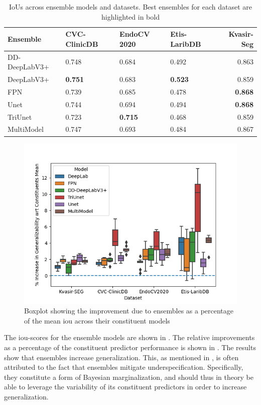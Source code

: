 \begin{table}[h]
    \centering
    \begin{tabularx}{\linewidth}{lXXXr}
\toprule
Ensemble  & CVC-ClinicDB & EndoCV 2020 & Etis-LaribDB & Kvasir-Seg \\
\midrule
DD-DeepLabV3+ & 0.748 &0.684 &0.492 &0.863 \\
DeepLabV3+ & \textbf{0.751} &0.683 &\textbf{0.523} &0.859 \\
FPN & 0.739 &0.685 &0.478 &\textbf{0.868} \\
Unet & 0.744 &0.694 &0.494 &\textbf{0.868} \\
TriUnet & 0.723 & \textbf{0.715} &  0.468 & 0.859 \\
MultiModel & 0.747 &0.693 &0.484 &0.867 \\
\bottomrule
\end{tabularx}
    \caption{IoUs across ensemble models and datasets. Best ensembles for each dataset are highlighted in bold}
    \label{tab:ensembles}
\end{table}

\begin{figure}[h]
    \centering
    \includegraphics[width=\linewidth]{illustrations/improvements_due_to_ensembles.png}
    \caption[Improvements due to Ensembles]{Boxplot showing the improvement due to ensembles as a percentage of the mean \gls{iou} across their constituent models}
    \label{fig:ensemble_improvements}
\end{figure}
The \gls{iou}-scores for the ensemble models are shown in . The relative improvements as a percentage of the constituent predictor performance is shown in . The results show that ensembles increase generalization.  This, as mentioned in , is often attributed to the fact that ensembles mitigate underspecification. Specifically, they constitute a form of Bayesian marginalization, and should thus in theory be able to leverage the variability of its constituent predictors in order to increase generalization.

